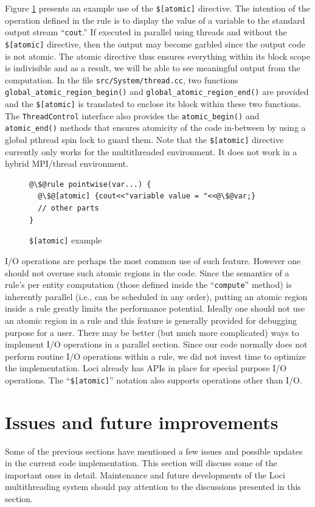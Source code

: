 \documentclass{article}
\begin{document}
Figure \ref{fig:atomic} presents an example use of the
\texttt{\$[atomic]} directive.  The intention of the operation defined
in the rule is to display the value of a variable to the standard output
stream ``\texttt{cout}.''  If executed in parallel using threads and
without the \texttt{\$[atomic]} directive, then the output may become
garbled since the output code is not atomic.  The atomic directive thus
ensures everything within its block scope is indivisible and as a
result, we will be able to see meaningful output from the computation.
In the file \texttt{src/System/thread.cc}, two functions
\lstinline{global_atomic_region_begin()} and
\lstinline{global_atomic_region_end()} are provided and the
\texttt{\$[atomic]} is translated to enclose its block within these two
functions.  The \lstinline{ThreadControl} interface also provides the
\lstinline{atomic_begin()} and \lstinline{atomic_end()} methods that
ensures atomicity of the code in-between by using a global pthread spin
lock to guard them.  Note that the \texttt{\$[atomic]} directive
currently only works for the multithreaded environment.  It does not
work in a hybrid MPI/thread environment.  

\begin{figure}[h]
\begin{lstlisting}[escapechar=@]
@\$@rule pointwise(var...) {
  @\$@[atomic] {cout<<"variable value = "<<@\$@var;}
  // other parts
}
\end{lstlisting}
\caption{\texttt{\$[atomic]} example\label{fig:atomic}}
\end{figure}

I/O operations are perhaps the most common use of such feature.  However
one should not overuse such atomic regions in the code.  Since the
semantics of a rule's per entity computation (those defined inside the
``\texttt{compute}'' method) is inherently parallel (i.e., can be
scheduled in any order), putting an atomic region inside a rule greatly
limits the performance potential.  Ideally one should not use an atomic
region in a rule and this feature is generally provided for debugging
purpose for a user.  There may be better (but much more complicated)
ways to implement I/O operations in a parallel section.  Since our code
normally does not perform routine I/O operations within a rule, we did
not invest time to optimize the implementation.  Loci already has APIs
in place for special purpose I/O operations.  The
``\texttt{\$[atomic]}'' notation also supports operations other than I/O.

\section{Issues and future improvements}
\label{sec:issues}
Some of the previous sections have mentioned a few issues and possible
updates in the current code implementation.  This section will discuss
some of the important ones in detail.  Maintenance and future
developments of the Loci multithreading system should pay attention to
the discussions presented in this section.
\end{document}
